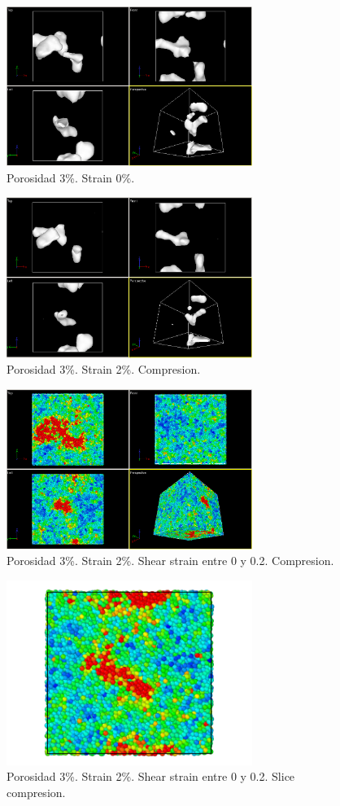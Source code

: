 \documentclass[10pt, oneside]{article} %
\begin{document}
\begin{figure}[H]
\centering
\includegraphics[width=8cm]{Figures/porosidad_3_muestra_0strain.png}
\caption{Porosidad 3\%. Strain 0\%.}
\end{figure}

\begin{figure}[H]
\centering
\includegraphics[width=8cm]{Figures/porosidad_3_muestra_2strain.png}
\caption{Porosidad 3\%. Strain 2\%. Compresion.}
\end{figure}

\begin{figure}[H]
\centering
\includegraphics[width=8cm]{Figures/porosidad_3_muestra_2strain_color_0_02.png}
\caption{Porosidad 3\%. Strain 2\%. Shear strain entre 0 y 0.2. Compresion.}
\end{figure}

\begin{figure}[H]
\centering
\includegraphics[width=8cm]{Figures/porosidad_3_muestra_2strain_color_slice_0_02.png}
\caption{Porosidad 3\%. Strain 2\%. Shear strain entre 0 y 0.2. Slice compresion.}
\end{figure}
\end{document}
